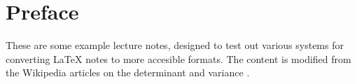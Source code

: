 \chapter{Preface}

These are some example lecture notes, designed to test out various
systems for converting LaTeX notes to more accesible formats. The
content is modified from the Wikipedia articles on the determinant \cite{Determinant} and
variance \cite{Variance}.
